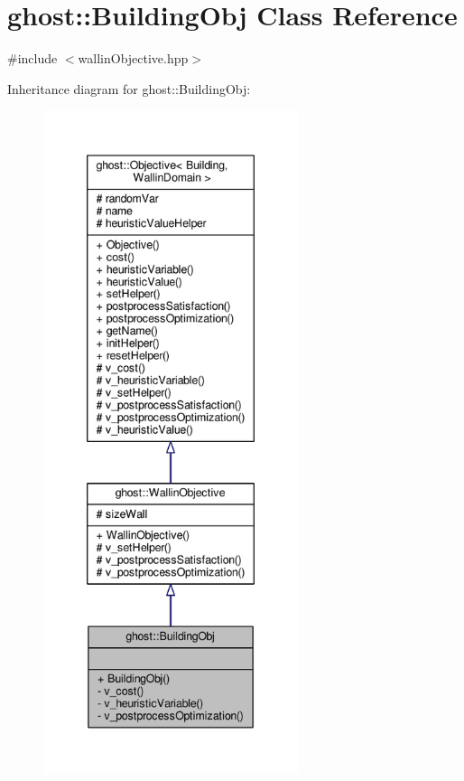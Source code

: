 \hypertarget{classghost_1_1BuildingObj}{\section{ghost\-:\-:Building\-Obj Class Reference}
\label{classghost_1_1BuildingObj}
}


{\ttfamily \#include $<$wallin\-Objective.\-hpp$>$}



Inheritance diagram for ghost\-:\-:Building\-Obj\-:
\nopagebreak
\begin{figure}[H]
\begin{center}
\leavevmode
\includegraphics[height=550pt]{classghost_1_1BuildingObj__inherit__graph}
\end{center}
\end{figure}


